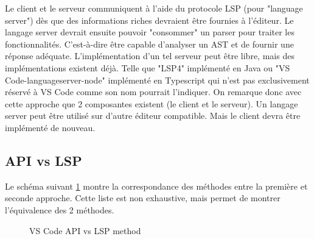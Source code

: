 \documentclass[
    iict, %
    il, %
]{heig-tb}
\begin{document}
\vspace{\parskip}

Le client et le serveur communiquent à l'aide du protocole LSP (pour "language server") dès que des informations riches devraient être fournies à l'éditeur.
Le langage server devrait ensuite pouvoir "consommer" un parser pour traiter les fonctionnalités. C'est-à-dire être capable d'analyser un AST et de fournir une réponse adéquate.
L'implémentation d'un tel serveur peut être libre, mais des implémentations existent déjà. Telle que "LSP4" implémenté en Java ou  "VS Code-languageserver-node" implémenté en Typescript qui n'est pas exclusivement réservé à VS Code comme son nom pourrait l'indiquer.
On remarque donc avec cette approche que 2 composantes existent (le client et le serveur).
Un langage server peut être utilisé sur d'autre éditeur compatible. Mais le client devra être implémenté de nouveau.

\subsection{API vs LSP}\label{api vs lsp}

Le schéma suivant \ref{api vs lsp} montre la correspondance des méthodes entre la première et seconde approche.
Cette liste est non exhaustive, mais permet de montrer l'équivalence des 2 méthodes.

\begin{figure}[!ht]
    \begin{center}
    \end{center}
    \caption[API vs LSP]{\label{api vs lsp} VS Code API vs LSP method}
\end{figure}
\end{document}
